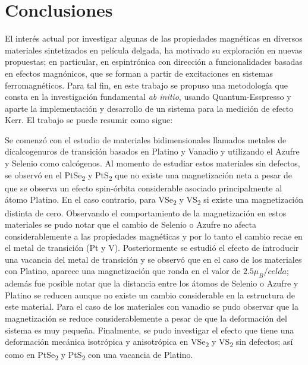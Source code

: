 \chapter{Conclusiones} \label{Conc:cap}
El interés actual por investigar algunas de las propiedades magnéticas en diversos materiales sintetizados en película delgada, ha motivado su exploración en nuevas propuestas; en particular, en espintr\'onica con dirección a funcionalidades basadas en efectos magn\'onicos, que se forman a partir de excitaciones en sistemas ferromagnéticos.
Para tal fin, en este trabajo se propuso una metodología que consta en la investigación fundamental \textit{ab initio}, usando Quantum-Esspresso y aparte la implementación y desarrollo de un sistema para la medici\'on de efecto Kerr. El trabajo se puede resumir como sigue:

Se comenz\'o con el estudio de materiales bidimensionales llamados metales de dicalcogenuros de transición basados en  Platino y  Vanadio y utilizando el Azufre y Selenio como calc\'ogenos. Al momento de estudiar estos materiales sin defectos, se observ\'o en el PtSe\textsubscript{2} y PtS\textsubscript{2} que no existe una magnetizaci\'on neta a pesar de que se observa un efecto spin-\'orbita considerable asociado principalmente al \'atomo  Platino. En el caso contrario,  para VSe\textsubscript{2} y  VS\textsubscript{2} si existe una magnetizaci\'on distinta de cero. Observando el comportamiento de la magnetizaci\'on en estos materiales se pudo notar que el cambio de Selenio o Azufre no afecta considerablemente a las propiedades magn\'eticas y por lo tanto  el cambio recae en el metal de transici\'on (Pt y V). 
 Posteriormente se estudi\'o el efecto de introducir una vacancia del metal de transici\'on y se observ\'o que en el caso de los materiales con Platino, aparece una magnetizaci\'on que ronda en el valor de $2.5 \mu_{B}/celda$; adem\'as fue posible notar que la distancia entre los \'atomos de Selenio o Azufre y Platino se reducen aunque no existe un cambio considerable en la estructura de este material.  Para  el caso de los materiales con vanadio se  pudo observar que la magnetizaci\'on se reduce considerablemente a pesar de que la deformaci\'on del sistema es muy peque\~na.
 Finalmente, se pudo investigar el efecto que tiene una deformaci\'on mec\'anica isotr\'opica y anisotr\'opica en VSe\textsubscript{2} y VS\textsubscript{2} sin defectos; as\'i como en  PtSe\textsubscript{2} y PtS\textsubscript{2} con una vacancia de Platino. 
